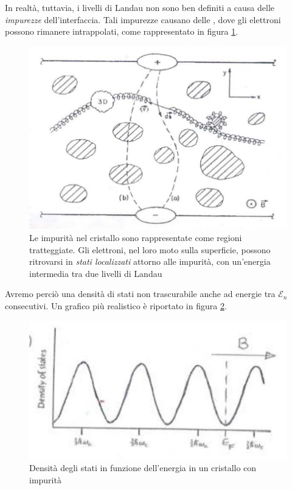 \documentclass[../../FisicaTeorica.tex]{subfiles}
\begin{document}
In realtà, tuttavia, i livelli di Landau non sono ben definiti a causa delle \textit{impurezze} dell'interfaccia. Tali impurezze causano delle , dove gli elettroni possono rimanere intrappolati, come rappresentato in figura \ref{fig:Landau_impurities}.

\begin{figure}[H]
\centering
\includegraphics[scale=0.5]{Immagini/12_12/image014.jpg}
\caption{Le impurità nel cristallo sono rappresentate come regioni tratteggiate. Gli elettroni, nel loro moto sulla superficie, possono ritrovarsi in \textit{stati localizzati} attorno alle impurità, con un'energia intermedia tra due livelli di Landau\label{fig:Landau_impurities}}
\end{figure}

Avremo perciò una densità di stati non trascurabile anche ad energie tra $\mathcal{E}_n$ consecutivi. Un grafico più realistico è riportato in figura \ref{fig:Landau_reale}.

\begin{figure}[H]
\centering
\includegraphics[scale=0.5]{Immagini/12_12/image015.jpg}
\caption{Densità degli stati in funzione dell'energia in un cristallo con impurità\label{fig:Landau_reale}}
\end{figure}
\end{document}

